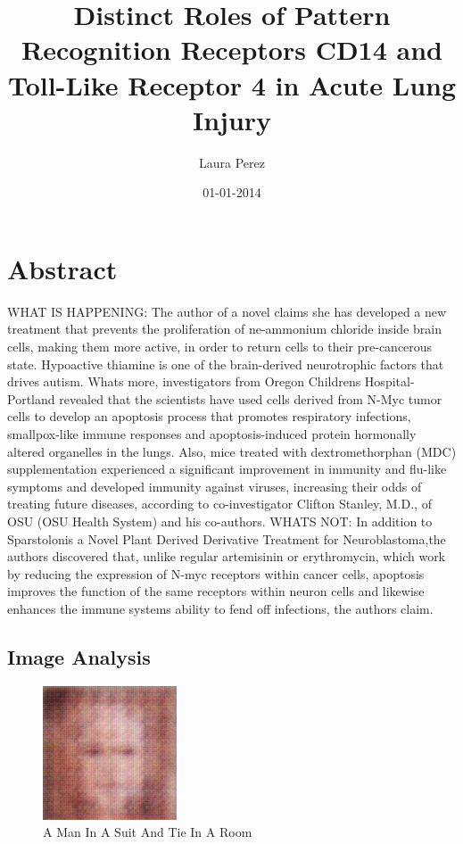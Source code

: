 \documentclass{article}%
\title{Distinct Roles of Pattern Recognition Receptors CD14 and Toll{-}Like Receptor 4 in Acute Lung Injury}%
\author{Laura Perez}%
\affil{Division of Cardio{-}Vascular Medicine, Department of Internal Medicine, Kurume University School of Medicine, Fukuoka, Japan}%
\date{01{-}01{-}2014}%
\begin{document}
%
\normalsize%
\maketitle%
\section{Abstract}%
\label{sec:Abstract}%
WHAT IS HAPPENING: The author of a novel claims she has developed a new treatment that prevents the proliferation of ne{-}ammonium chloride inside brain cells, making them more active, in order to return cells to their pre{-}cancerous state. Hypoactive thiamine is one of the brain{-}derived neurotrophic factors that drives autism. Whats more, investigators from Oregon Childrens Hospital{-}Portland revealed that the scientists have used cells derived from N{-}Myc tumor cells to develop an apoptosis process that promotes respiratory infections, smallpox{-}like immune responses and apoptosis{-}induced protein hormonally altered organelles in the lungs. Also, mice treated with dextromethorphan (MDC) supplementation experienced a significant improvement in immunity and flu{-}like symptoms and developed immunity against viruses, increasing their odds of treating future diseases, according to co{-}investigator Clifton Stanley, M.D., of OSU (OSU Health System) and his co{-}authors.\newline%
WHATS NOT: In addition to Sparstolonis a Novel Plant Derived Derivative Treatment for Neuroblastoma,the authors discovered that, unlike regular artemisinin or erythromycin, which work by reducing the expression of N{-}myc receptors within cancer cells, apoptosis improves the function of the same receptors within neuron cells and likewise enhances the immune systems ability to fend off infections, the authors claim.

%
\subsection{Image Analysis}%
\label{subsec:ImageAnalysis}%


\begin{figure}[h!]%
\centering%
\includegraphics[width=150px]{500_fake_images/samples_5_317.png}%
\caption{A Man In A Suit And Tie In A Room}%
\end{figure}

%
\end{document}
